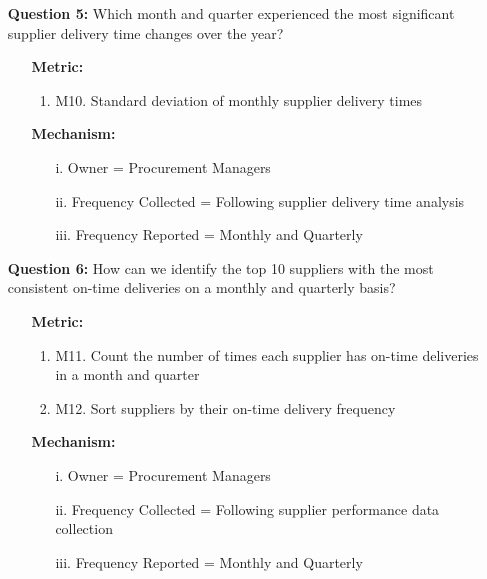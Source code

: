 \documentclass[english,12pt,a4paper]{report}
\begin{document}
\begin{itemize}
		\item[\textbullet] \textbf{Question 5:} Which month and quarter experienced the most significant supplier delivery time changes over the year? 
		\begin{itemize}
			\item[] \textbf{Metric:}
			\begin{enumerate}[label={}, left=0em]
				\item M10. Standard deviation of monthly supplier delivery times
			\end{enumerate}
			\item[] \textbf{Mechanism:}
			\begin{enumerate}[label={}, left=0em]
				\item[i.] Owner = Procurement Managers
				\item[ii.] Frequency Collected = Following supplier delivery time analysis
				\item[iii.] Frequency Reported = Monthly and Quarterly
			\end{enumerate}
		\end{itemize}
		
		\item[\textbullet] \textbf{Question 6:} How can we identify the top 10 suppliers with the most consistent on-time deliveries on a monthly and quarterly basis? 
		\begin{itemize}
			\item[] \textbf{Metric:}
			\begin{enumerate}[label={}, left=0em]
				\item M11. Count the number of times each supplier has on-time deliveries in a month and quarter
				\item M12. Sort suppliers by their on-time delivery frequency
			\end{enumerate}
			\item[] \textbf{Mechanism:}
			\begin{enumerate}[label={}, left=0em]
				\item[i.] Owner = Procurement Managers
				\item[ii.] Frequency Collected = Following supplier performance data collection
				\item[iii.] Frequency Reported = Monthly and Quarterly
			\end{enumerate}
		\end{itemize}
		

\end{itemize}
\end{document}
